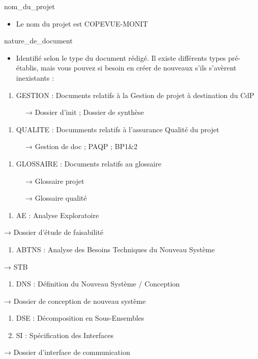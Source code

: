 \documentclass{mise_en_page}
\begin{document}
nom\_du\_projet

\begin{itemize}
\item Le nom du projet est COPEVUE-MONIT
\end{itemize}



nature\_de\_document

\begin{itemize}
\item Identifié selon le type du document rédigé. Il existe différents
types pré-établis, mais vous pouvez si besoin en créer de nouveaux
s’ils s’avèrent inexistants :
\end{itemize}
\begin{enumerate}
\item GESTION : Documents relatifs à la Gestion de projet à destination
du CdP
\end{enumerate}
\ \ \ \ \ \ → Dossier d’init ; Dossier de synthèse

\begin{enumerate}
\item QUALITE : Documments relatifs à l’assurance Qualité du projet
\end{enumerate}
\ \ \ \ \ \ → Gestion de doc ; PAQP ; BP1\&2

\begin{enumerate}
\item GLOSSAIRE : Documents relatifs au glossaire
\end{enumerate}
\ \ \ \ \ \ → Glossaire projet

\ \ \ \ \ \ → Glossaire qualité

\begin{enumerate}
\item AE : Analyse Exploratoire
\end{enumerate}
→ Dossier d’étude de faisabilité

\begin{enumerate}
\item ABTNS : Analyse des Besoins Techniques du Nouveau Système
\end{enumerate}
→ STB

\begin{enumerate}
\item DNS : Définition du Nouveau Système / Conception
\end{enumerate}
→ Dossier de conception de nouveau système

\begin{enumerate}
\item DSE : Décomposition en Sous-Ensembles
\item SI : Spécification des Interfaces
\end{enumerate}
→ Dossier d’interface de communication
\end{document}
